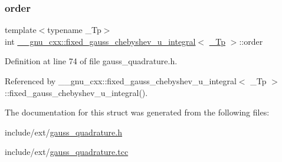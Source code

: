 \subsubsection{\texorpdfstring{order}{order}}
{\footnotesize\ttfamily template$<$typename \+\_\+\+Tp$>$ \\
int \hyperlink{struct____gnu__cxx_1_1fixed__gauss__chebyshev__u__integral}{\+\_\+\+\_\+gnu\+\_\+cxx\+::fixed\+\_\+gauss\+\_\+chebyshev\+\_\+u\+\_\+integral}$<$ \hyperlink{namespace____gnu__cxx_a3b19a9c800ca194374ef9172290f7d79}{\+\_\+\+Tp} $>$\+::order}



Definition at line 74 of file gauss\+\_\+quadrature.\+h.



Referenced by \+\_\+\+\_\+gnu\+\_\+cxx\+::fixed\+\_\+gauss\+\_\+chebyshev\+\_\+u\+\_\+integral$<$ \+\_\+\+Tp $>$\+::fixed\+\_\+gauss\+\_\+chebyshev\+\_\+u\+\_\+integral().



The documentation for this struct was generated from the following files\+:\begin{DoxyCompactItemize}
\item 
include/ext/\hyperlink{gauss__quadrature_8h}{gauss\+\_\+quadrature.\+h}\item 
include/ext/\hyperlink{gauss__quadrature_8tcc}{gauss\+\_\+quadrature.\+tcc}\end{DoxyCompactItemize}
